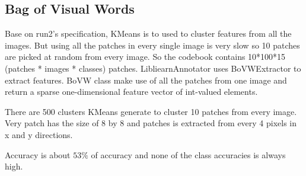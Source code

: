\documentclass[paper=a4, fontsize=11pt]{article}
\begin{document}
\subsection{Bag of Visual Words}

Base on run2's specification, KMeans is to used to cluster features from all the images. But using all the patches in every single image is very slow so 10 patches are picked at random from every image. So the codebook contains 10*100*15 (patches * images * classes) patches. LibliearnAnnotator uses BoVWExtractor to extract features. BoVW class make use of all the patches from one image and return a sparse one-dimensional feature vector of int-valued elements. 

There are 500 clusters KMeans generate to cluster 10 patches from every image. Very patch has the size of 8 by 8 and patches is extracted from every 4 pixels in x and y directions. 

Accuracy is about $53\%$ of accuracy and none of the class accuracies is always high.
\end{document}
